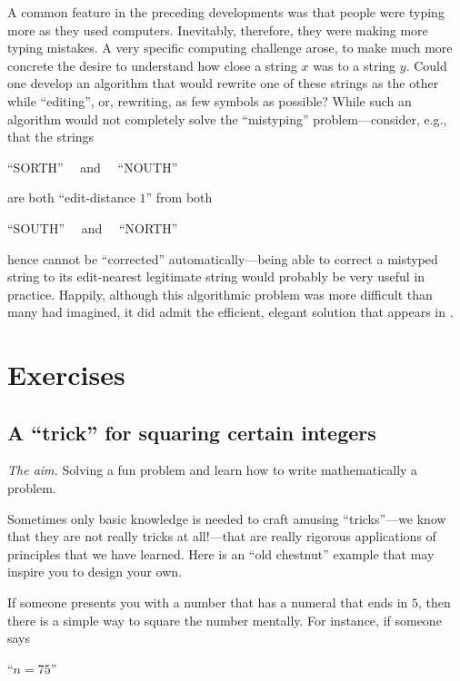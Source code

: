 A common feature in the preceding developments was that people were typing more as they used computers.  Inevitably, therefore, they were making more typing mistakes.  A very specific computing challenge arose, to make much more concrete the desire to understand how close a
string $x$ was to a string $y$.  Could one develop an algorithm that would rewrite one of these strings as the other while ``editing'', or, rewriting, as few symbols as possible?  While such an algorithm would not completely solve the ``mistyping'' problem---consider, e.g., that the strings

\hspace*{.25in} ``SORTH'' \ \ and \ \ ``NOUTH''

\noindent
are both ``edit-distance $1$'' from both

\hspace*{.25in} ``SOUTH'' \ \ and \ \ ``NORTH''

\noindent
hence cannot be ``corrected'' automatically---being able to correct a mistyped string to its edit-nearest legitimate string would probably be very useful in practice.  Happily, although this algorithmic problem was more difficult than many had imagined, it did admit the efficient, elegant solution that appears in \cite{WagnerF74}.



\section{Exercises}


\subsection{A ``trick'' for squaring certain integers}

\noindent \textit{The aim.}
Solving a fun problem and learn how to write mathematically a problem.

Sometimes only basic knowledge is needed to craft amusing
``tricks''---we know that they are not really tricks at all!---that
are really rigorous applications of principles that we have learned.
Here is an ``old chestnut'' example that may inspire you to design
your own. 

If someone presents you with a number that has a numeral that ends in
$5$, then there is a simple way to square the number mentally.  For
instance, if someone says

\hspace{.25in}``$n = 75$''

